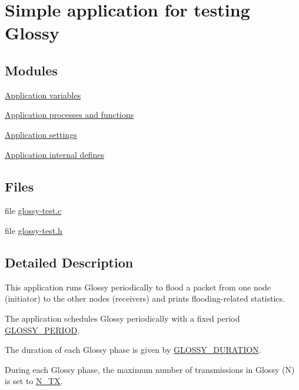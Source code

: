 \hypertarget{group__glossy-test}{
\section{Simple application for testing Glossy}
\label{group__glossy-test}
}
\subsection*{Modules}
\begin{DoxyCompactItemize}
\item 
\hyperlink{group__glossy-test-variables}{Application variables}
\item 
\hyperlink{group__glossy-test-processes}{Application processes and functions}
\item 
\hyperlink{group__glossy-test-settings}{Application settings}
\item 
\hyperlink{group__glossy-test-defines}{Application internal defines}
\end{DoxyCompactItemize}
\subsection*{Files}
\begin{DoxyCompactItemize}
\item 
file \hyperlink{glossy-test_8c}{glossy-\/test.c}
\item 
file \hyperlink{glossy-test_8h}{glossy-\/test.h}
\end{DoxyCompactItemize}


\subsection{Detailed Description}
This application runs Glossy periodically to flood a packet from one node (initiator) to the other nodes (receivers) and prints flooding-\/related statistics.

The application schedules Glossy periodically with a fixed period \hyperlink{group__glossy-test-settings_ga6f68058577fdbfccbd8e50537609a5e4}{GLOSSY\_\-PERIOD}.

The duration of each Glossy phase is given by \hyperlink{group__glossy-test-settings_ga26e366aad612a866fe38ef7bd7629858}{GLOSSY\_\-DURATION}.

During each Glossy phase, the maximum number of transmissions in Glossy (N) is set to \hyperlink{group__glossy-test-settings_ga50f8fba62aef680d9929caefea7ca7e4}{N\_\-TX}.

